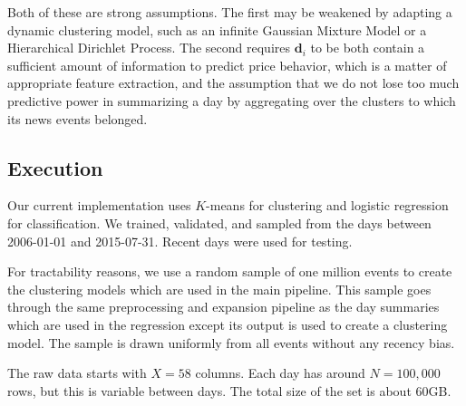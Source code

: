 Both of these are strong assumptions. The first may be weakened by adapting a dynamic clustering model, such as an infinite Gaussian Mixture Model or a Hierarchical Dirichlet Process. The second requires $\textbf{d}_i$ to be both contain a sufficient amount of information to predict price behavior, which is a matter of appropriate feature extraction, and the assumption that we do not lose too much predictive power in summarizing a day by aggregating over the clusters to which its news events belonged.

\subsection{Execution}

Our current implementation uses $K$-means for clustering and logistic regression for classification. We trained, validated, and sampled from the days between 2006-01-01 and 2015-07-31. Recent days were used for testing.

For tractability reasons, we use a random sample of one million events to create the clustering models which are used in the main pipeline. This sample goes through the same preprocessing and expansion pipeline as the day summaries which are used in the regression except its output is used to create a clustering model. The sample is drawn uniformly from all events without any recency bias.

The raw data starts with $X=58$ columns. Each day has around $N=100,000$ rows, but this is variable between days. The total size of the set is about 60GB.


